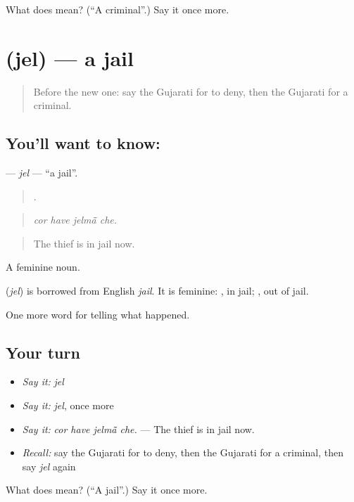 \begin{tcolorbox}[breakable,colback=teal!4,colframe=teal!35!black,title={Before you move on}]
What does  mean? (\textquotedblleft{}A criminal\textquotedblright{}.) Say it once more.
\end{tcolorbox}
\section[\texorpdfstring{\gu{જેલ} (jel)}{જેલ (jel)}]{ (jel) — a jail}

\label{lesson:GU-C288-jel}



\begin{quote}
Before the new one: say the Gujarati for to deny, then the Gujarati for a criminal.
\end{quote}

\subsection*{You'll want to know: }
\textbf{} — \emph{jel} — \textquotedblleft{}a jail\textquotedblright{}.

\begin{quote}
   .
\end{quote}

\begin{quote}
\emph{cor have jelmā̃ che.}
\end{quote}

\begin{quote}
The thief is in jail now.
\end{quote}

A feminine noun.

\begin{cousinweb}
\textbf{} (\emph{jel}) is borrowed from English \emph{jail}. It is feminine: \textbf{}, in jail; \textbf{}, out of jail.
\end{cousinweb}

\begin{grammarlens}[title={What you've built}]
One more word for telling what happened.
\end{grammarlens}

\subsection*{Your turn}
\begin{itemize}
\raggedright
  \item \emph{Say it:} \emph{jel}
  \item \emph{Say it:} \emph{jel}, once more
  \item \emph{Say it:} \emph{cor have jelmā̃ che.} — The thief is in jail now.
  \item \emph{Recall:} say the Gujarati for to deny, then the Gujarati for a criminal, then say \emph{jel} again
\end{itemize}

\begin{tcolorbox}[breakable,colback=teal!4,colframe=teal!35!black,title={Before you move on}]
What does  mean? (\textquotedblleft{}A jail\textquotedblright{}.) Say it once more.
\end{tcolorbox}
